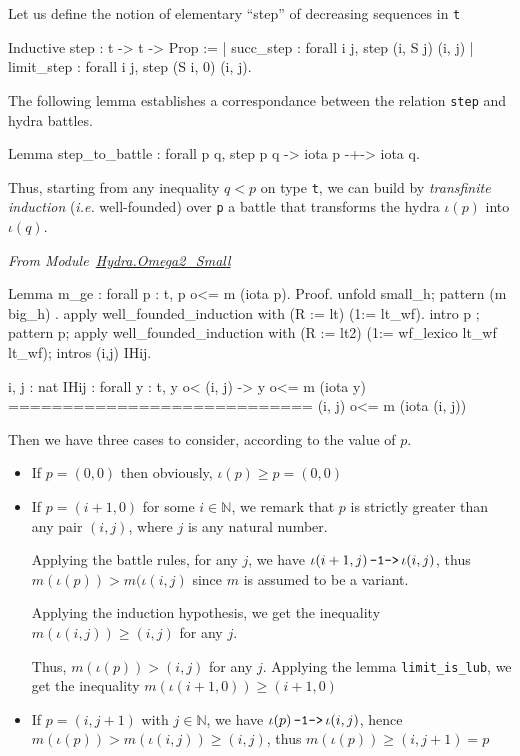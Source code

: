 Let us define the notion of elementary ``step'' of decreasing sequences in
\texttt{t}


\begin{Coqsrc}
  Inductive step : t -> t -> Prop :=
  | succ_step : forall i j,  step (i, S j) (i, j)
  | limit_step : forall i j, step (S i, 0) (i, j).
\end{Coqsrc}

The following lemma establishes a correspondance between the relation
\texttt{step} and hydra battles.

\begin{Coqsrc}
  Lemma step_to_battle : forall p q, step p q -> iota p -+-> iota q.
\end{Coqsrc}


Thus, starting from any inequality $q < p$ on type \texttt{t}, we can build 
by \emph{transfinite induction} (\emph{i.e.} well-founded) over \texttt{p} a battle 
that transforms the hydra $\iota(p)$ into $\iota(q)$.

\vspace{4pt}
\emph{From Module~\href{../theories/html/hydras.Hydra.Omega2_Small.html\#m_ge}{Hydra.Omega2\_Small}}

\begin{Coqsrc}
  Lemma m_ge : forall p : t,   p o<= m (iota p).
  Proof.
    unfold small_h; pattern (m big_h) .   
     apply  well_founded_induction with (R := lt) (1:= lt_wf).
     intro p ; pattern p;
     apply  well_founded_induction with 
               (R := lt2) (1:= wf_lexico lt_wf lt_wf);
     intros (i,j) IHij. 
\end{Coqsrc}

\begin{Coqanswer}
  i, j : nat
  IHij : forall y : t, y o< (i, j) -> y o<= m (iota y)
  ============================
  (i, j) o<= m (iota (i, j)) 
\end{Coqanswer}


Then we have  three cases to consider, according to the value of $p$.
\begin{itemize}
\item If $p=(0,0)$ then obviously, $\iota(p)\geq p = (0,0)$
\item If  $p=(i+1,0)$ for some $i\in\mathbb{N}$, we
 remark  that $p$ is strictly greater than any pair $ (i, j)$, where $j$ 
is any natural number.

Applying the battle rules, for any $j$, we have $\iota(i+1,j)  {\mbox{\,\texttt{-1->}\,}} \iota(i, j) $, thus $m(\iota(p)) > m(\iota(i,j)$ since  $m$ is assumed to be a variant.

Applying the induction hypothesis, we get the inequality
 $ m(\iota(i,j)) \geq (i,j)$ for any $j$. 

Thus, $m(\iota(p)) > (i,j)$ for any $j$.
Applying the lemma \texttt{limit\_is\_lub}, we get  the inequality
$m(\iota(i+1,0))\geq (i+1,0)$

\item If $p=(i,j+1)$ with $j\in\mathbb{N}$, we have  $\iota(p)  {\mbox{\,\texttt{-1->}\,}} \iota(i, j) $,
hence $m(\iota(p))> m(\iota(i,j)) \geq (i,j)$, thus $m(\iota(p))\geq (i,j+1)=p$

\end{itemize}


